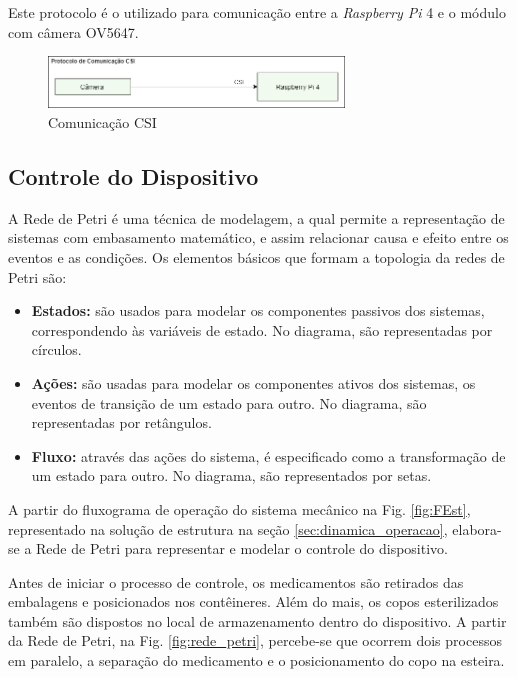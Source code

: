 \begin{itemize}
    Este protocolo é o utilizado para comunicação entre a \textit{Raspberry Pi} 4 e o módulo com câmera OV5647.
    
\begin{figure}[H]
    \centering
    \includegraphics[width=0.7\textwidth]{figuras/eletronica/fluxogramas/comunicacao_csi.png}
    \caption{Comunicação CSI}
    \label{fig:PC_CSI}
\end{figure}
    
\end{itemize}

\subsection{Controle do Dispositivo}\label{sec:rede_petri}

A Rede de Petri é uma técnica de modelagem, a qual permite a representação de sistemas com embasamento matemático, e assim relacionar causa e efeito entre os eventos e as condições. Os elementos básicos que formam a topologia da redes de Petri são:

\begin{itemize}
    \item \textbf{Estados:} são usados para modelar os componentes passivos dos sistemas, correspondendo às variáveis de estado. No diagrama, são representadas por círculos.
    \item \textbf{Ações:} são usadas para modelar os componentes ativos dos sistemas, 
    os eventos de transição de um estado para outro. No diagrama, são representadas por retângulos.
    \item \textbf{Fluxo:} através das ações do sistema, é especificado como a transformação de um estado para outro. No diagrama, são representados por setas.
\end{itemize}

A partir do fluxograma de operação do sistema mecânico na Fig. \ref{fig:FEst}, representado na solução de estrutura na seção \ref{sec:dinamica_operacao}, elabora-se a Rede de Petri para representar e modelar o controle do dispositivo. 

Antes de iniciar o processo de controle, os medicamentos são retirados das embalagens e posicionados nos contêineres. Além do mais, os copos esterilizados também são dispostos no local de armazenamento dentro do dispositivo. A partir da Rede de Petri, na Fig. \ref{fig:rede_petri},  percebe-se que ocorrem dois processos em paralelo, a separação do medicamento e o posicionamento do copo na esteira. 

